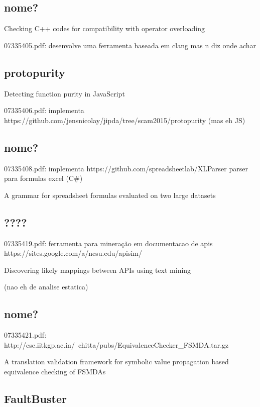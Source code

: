 \subsection{nome?}

Checking C++ codes for compatibility with operator overloading

07335405.pdf: desenvolve uma ferramenta baseada em clang mas n diz onde achar

\subsection{protopurity}

Detecting function purity in JavaScript

07335406.pdf: implementa https://github.com/jensnicolay/jipda/tree/scam2015/protopurity (mas eh JS)

\subsection{nome?}

07335408.pdf: implementa https://github.com/spreadsheetlab/XLParser parser para formulas excel (C\#)

A grammar for spreadsheet formulas evaluated on two large datasets

\subsection{????}

07335419.pdf: ferramenta para mineração em documentacao de apis https://sites.google.com/a/ncsu.edu/apisim/

Discovering likely mappings between APIs using text mining

(nao eh de analise estatica)

\subsection{nome?}

07335421.pdf: http://cse.iitkgp.ac.in/~chitta/pubs/EquivalenceChecker\_FSMDA.tar.gz

A translation validation framework for symbolic value propagation based equivalence checking of FSMDAs

\subsection{FaultBuster}


